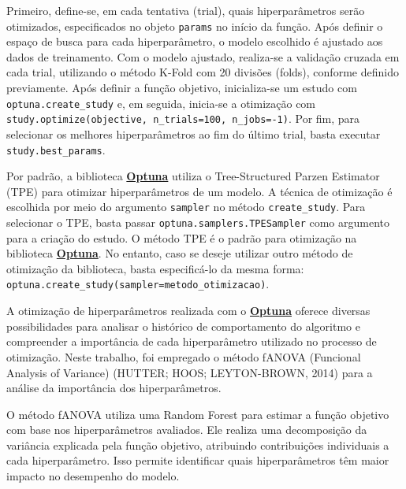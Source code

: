 \documentclass[
  12pt,
  a4paper,
]{scrreprt}
\begin{document}
Primeiro, define-se, em cada tentativa (trial), quais hiperparâmetros
serão otimizados, especificados no objeto \texttt{params} no início da
função. Após definir o espaço de busca para cada hiperparâmetro, o
modelo escolhido é ajustado aos dados de treinamento. Com o modelo
ajustado, realiza-se a validação cruzada em cada trial, utilizando o
método K-Fold com 20 divisões (folds), conforme definido previamente.
Após definir a função objetivo, inicializa-se um estudo com
\texttt{optuna.create\_study} e, em seguida, inicia-se a otimização com
\texttt{study.optimize(objective,\ n\_trials=100,\ n\_jobs=-1)}. Por
fim, para selecionar os melhores hiperparâmetros ao fim do último trial,
basta executar \texttt{study.best\_params}.

\vspace{12pt}

Por padrão, a biblioteca \href{https://optuna.org/}{\textbf{Optuna}}
utiliza o Tree-Structured Parzen Estimator (TPE) para otimizar
hiperparâmetros de um modelo. A técnica de otimização é escolhida por
meio do argumento \texttt{sampler} no método \texttt{create\_study}.
Para selecionar o TPE, basta passar \texttt{optuna.samplers.TPESampler}
como argumento para a criação do estudo. O método TPE é o padrão para
otimização na biblioteca \href{https://optuna.org/}{\textbf{Optuna}}. No
entanto, caso se deseje utilizar outro método de otimização da
biblioteca, basta especificá-lo da mesma forma:
\texttt{optuna.create\_study(sampler=metodo\_otimizacao)}.

\vspace{12pt}

A otimização de hiperparâmetros realizada com o
\href{https://optuna.org/}{\textbf{Optuna}} oferece diversas
possibilidades para analisar o histórico de comportamento do algoritmo e
compreender a importância de cada hiperparâmetro utilizado no processo
de otimização. Neste trabalho, foi empregado o método fANOVA (Funcional
Analysis of Variance) (HUTTER; HOOS; LEYTON-BROWN, 2014) para a análise
da importância dos hiperparâmetros.

\vspace{12pt}

O método fANOVA utiliza uma Random Forest para estimar a função objetivo
com base nos hiperparâmetros avaliados. Ele realiza uma decomposição da
variância explicada pela função objetivo, atribuindo contribuições
individuais a cada hiperparâmetro. Isso permite identificar quais
hiperparâmetros têm maior impacto no desempenho do modelo.
\end{document}
